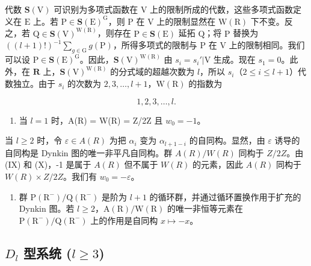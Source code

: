 代数 \(\mathbf{S}(\mathrm{V})\) 可识别为多项式函数在 \(\mathrm{V}\) 上的限制所成的代数，这些多项式函数定义在 \(\mathrm{E}\) 上。若 \(\mathrm{P} \in \mathbf{S}(\mathrm{E})^{\mathrm{G}}\)，则 \(\mathrm{P}\) 在 \(\mathrm{V}\) 上的限制显然在 \(\mathrm{W}(\mathrm{R})\) 下不变。反之，若 \(\mathrm{Q} \in \mathbf{S}(\mathrm{V})^{\mathrm{W}(\mathrm{R})}\)，则存在 \(\mathrm{P} \in \mathbf{S}(\mathrm{E})\) 延拓 \(\mathrm{Q}\)；将 \(\mathrm{P}\) 替换为 \(((l + 1)!)^{-1} \sum_{g \in \mathrm{G}} g(\mathrm{P})\)，所得多项式的限制与 \(\mathrm{P}\) 在 \(\mathrm{V}\) 上的限制相同。我们可以设 \(\mathrm{P} \in \mathbf{S}(\mathrm{E})^{\mathrm{G}}\)。因此，\(\mathbf{S}(\mathrm{V})^{\mathrm{W}(\mathrm{R})}\) 由 \(s_i = s_i'|\mathrm{V}\) 生成。现在 \(s_1 = 0\)。此外，在 \(\mathbf{R}\) 上，\(\mathbf{S}(\mathrm{V})^{\mathrm{W}(\mathrm{R})}\) 的分式域的超越次数为 \(l\)，所以 \(s_i\)（\(2 \leqslant i \leqslant l + 1\)）代数独立。由于 \(s_i\) 的次数为 \(2, 3, \ldots, l + 1\)，\(\mathrm{W}(\mathrm{R})\) 的指数为

\[
1, 2, 3, \dots , l.
\]

\begin{enumerate}
\def\labelenumi{(\Roman{enumi})}
\setcounter{enumi}{10}
\tightlist
\item
  当 \(l = 1\) 时，A(R) = W(R) = Z/2Z 且 \(w_0 = -1\)。
\end{enumerate}

当 \(l \geqslant 2\) 时，令 \(\varepsilon \in A(R)\) 为把 \(\alpha_i\) 变为 \(\alpha_{l+1-i}\) 的自同构。显然，由 \(\varepsilon\) 诱导的自同构是 Dynkin 图的唯一非平凡自同构。群 \(A(R)/W(R)\) 同构于 \(Z/2Z\)。由 (IX) 和 (X)，-1 是属于 \(A(R)\) 但不属于 \(W(R)\) 的元素，因此 \(A(R)\) 同构于 \(W(R) \times Z/2Z\)。我们有 \(w_0 = -\varepsilon\)。

\begin{enumerate}
\def\labelenumi{(\Roman{enumi})}
\setcounter{enumi}{11}
\tightlist
\item
  群 \(\mathrm{P}(\mathrm{R}^{-})/\mathrm{Q}(\mathrm{R}^{-})\) 是阶为 \(l+1\) 的循环群，并通过循环置换作用于扩充的 Dynkin 图。若 \(l\geqslant2\)，\(\mathrm{A}(\mathrm{R})/\mathrm{W}(\mathrm{R})\) 的唯一非恒等元素在 \(\mathrm{P}(\mathrm{R}^{-})/\mathrm{Q}(\mathrm{R}^{-})\) 上的作用是自同构 \(x\mapsto-x\)。
\end{enumerate}

\subsection{\texorpdfstring{\(D_{l}\) 型系统 (\(l \geqslant 3\))}{D\_l 型系统 (l >= 3)}}

